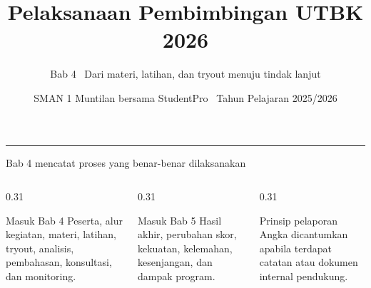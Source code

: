 \renewcommand{\currentchapter}{4}
\title{Pelaksanaan Pembimbingan UTBK 2026}
\subtitle{Bab 4 \textbar\ Dari materi, latihan, dan tryout menuju tindak lanjut}
\date{SMAN 1 Muntilan bersama StudentPro \textbar\ Tahun Pelajaran 2025/2026}

\begingroup
{}
\begin{frame}[plain]
  \vspace{0.65cm}
  \vspace{0.08cm}
  {\color{StudentWhite}\inserttitle\par}
  \vspace{0.38cm}
  {\color{StudentSoft}\insertsubtitle\par}
  \vfill
  {\color{StudentGold}\rule{2.3cm}{2.5pt}}\par
  \vspace{0.20cm}
  {\color{StudentWhite}\insertauthor}\par
  {\color{StudentSoft}\insertdate}
  \vspace{0.42cm}
\end{frame}
\endgroup

\begin{frame}{Bab 4 mencatat proses yang benar-benar dilaksanakan}
  \begin{columns}[T,onlytextwidth]
    \begin{column}{0.31\textwidth}
      \begin{block}{Masuk Bab 4}
        Peserta, alur kegiatan, materi, latihan, tryout, analisis, pembahasan, konsultasi, dan monitoring.
      \end{block}
    \end{column}
    \begin{column}{0.31\textwidth}
      \begin{block}{Masuk Bab 5}
        Hasil akhir, perubahan skor, kekuatan, kelemahan, kesenjangan, dan dampak program.
      \end{block}
    \end{column}
    \begin{column}{0.31\textwidth}
      \begin{block}{Prinsip pelaporan}
        Angka dicantumkan apabila terdapat catatan atau dokumen internal pendukung.
      \end{block}
    \end{column}
  \end{columns}
  \vspace{0.24cm}
\end{frame}

